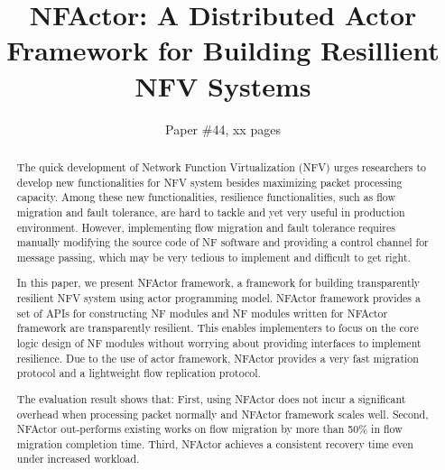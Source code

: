\documentclass{sig-alternate-10pt}
\begin{document}
\title{\Large \bf NFActor: A Distributed Actor Framework for Building Resillient NFV Systems}

\author{
Paper \#44, xx pages
}

\maketitle

\begin{abstract}

The quick development of Network Function Virtualization (NFV) urges researchers to develop new functionalities for NFV system besides maximizing packet processing capacity. Among these new functionalities, resilience functionalities, such as flow migration and fault tolerance, are hard to tackle and yet very useful in production environment. However, implementing flow migration and fault tolerance requires manually modifying the source code of NF software and providing a control channel for message passing, which may be very tedious to implement and difficult to get right.

In this paper, we present NFActor framework, a framework for building transparently resilient NFV system using actor programming model. NFActor framework provides a set of APIs for constructing NF modules and NF modules written for NFActor framework are transparently resilient. This enables implementers to focus on the core logic design of NF modules without worrying about providing interfaces to implement resilience. Due to the use of actor framework, NFActor provides a very fast migration protocol and a lightweight flow replication protocol.

The evaluation result shows that: First, using NFActor does not incur a significant overhead when processing packet normally and NFActor framework scales well. Second, NFActor out-performs existing works on flow migration by more than 50\% in flow migration completion time. Third, NFActor achieves a consistent recovery time even under increased workload.


\end{abstract}








%





\end{document}
